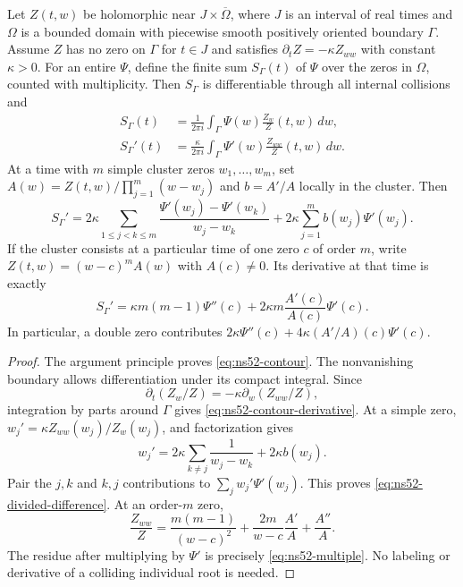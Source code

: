 \begin{proposition}
\label{prop:ns52-cluster}
Let $Z(t,w)$ be holomorphic near $J\times\overline\Omega$, where
$J$ is an interval of real times and $\Omega$ is a bounded domain
with piecewise smooth positively oriented boundary $\Gamma$.
Assume $Z$ has no zero on $\Gamma$ for $t\in J$ and satisfies
$\partial_t Z=-\kappa Z_{ww}$ with constant $\kappa>0$.
For an entire $\Psi$, define the finite sum $S_\Gamma(t)$ of
$\Psi$ over the zeros in $\Omega$, counted with multiplicity.
Then $S_\Gamma$ is differentiable through all internal collisions and
\begin{align}
 S_\Gamma(t)&=\frac1{2\pi i}\int_\Gamma
                   \Psi(w)\frac{Z_w}{Z}(t,w)\,dw,
                   \label{eq:ns52-contour}\\
 S_\Gamma'(t)&=\frac{\kappa}{2\pi i}\int_\Gamma
                   \Psi'(w)\frac{Z_{ww}}{Z}(t,w)\,dw.
                   \label{eq:ns52-contour-derivative}
\end{align}
At a time with $m$ simple cluster zeros $w_1,\ldots,w_m$, set
$A(w)=Z(t,w)/\prod_{j=1}^m(w-w_j)$ and $b=A'/A$ locally in
the cluster. Then
\begin{equation}\label{eq:ns52-divided-difference}
 S_\Gamma'
 =2\kappa\sum_{1\le j<k\le m}
       \frac{\Psi'(w_j)-\Psi'(w_k)}{w_j-w_k}
   +2\kappa\sum_{j=1}^m b(w_j)\Psi'(w_j).
\end{equation}
If the cluster consists at a particular time of one zero $c$ of
order $m$, write $Z(t,w)=(w-c)^m A(w)$ with $A(c)\ne0$. Its
derivative at that time is exactly
\begin{equation}\label{eq:ns52-multiple}
 S_\Gamma'=
 \kappa m(m-1)\Psi''(c)
       +2\kappa m\frac{A'(c)}{A(c)}\Psi'(c).
\end{equation}
In particular, a double zero contributes
$2\kappa\Psi''(c)+4\kappa(A'/A)(c)\Psi'(c)$.
\end{proposition}
\begin{proof}
The argument principle proves \eqref{eq:ns52-contour}. The nonvanishing
boundary allows differentiation under its compact integral. Since
\[
 \partial_t(Z_w/Z)=-\kappa\partial_w(Z_{ww}/Z),
\]
integration by parts around $\Gamma$ gives
\eqref{eq:ns52-contour-derivative}. At a simple zero,
$w_j'=\kappa Z_{ww}(w_j)/Z_w(w_j)$, and factorization gives
\[
 w_j'=2\kappa\sum_{k\ne j}\frac1{w_j-w_k}
                         +2\kappa b(w_j).
\]
Pair the $j,k$ and $k,j$ contributions to $\sum_jw_j'\Psi'(w_j)$.
This proves \eqref{eq:ns52-divided-difference}. At an order-$m$ zero,
\[
 \frac{Z_{ww}}Z=\frac{m(m-1)}{(w-c)^2}
       +\frac{2m}{w-c}\frac{A'}A+\frac{A''}A.
\]
The residue after multiplying by $\Psi'$ is precisely
\eqref{eq:ns52-multiple}. No labeling or derivative of a colliding
individual root is needed.
\end{proof}

